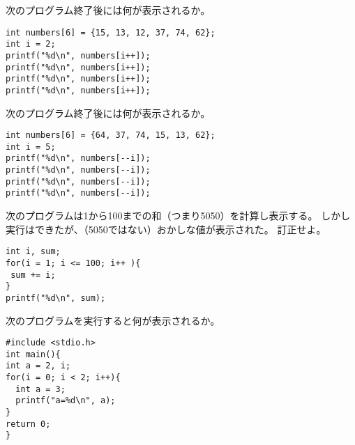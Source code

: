 \documentclass[12pt,a4j]{jarticle}
\newcounter{toi}
\def\toi{%
\bigskip\bigskip\noindent
\addtocounter{toi}{1}
\shadowbox{\bfseries\large 問\thetoi}
\nopagebreak[4]\bigskip\nopagebreak[4]
}
\begin{document}




\toi


次のプログラム終了後には何が表示されるか。
\begin{verbatim}
int numbers[6] = {15, 13, 12, 37, 74, 62};
int i = 2;
printf("%d\n", numbers[i++]);
printf("%d\n", numbers[i++]);
printf("%d\n", numbers[i++]);
printf("%d\n", numbers[i++]);
\end{verbatim}




\toi


次のプログラム終了後には何が表示されるか。
\begin{verbatim}
int numbers[6] = {64, 37, 74, 15, 13, 62};
int i = 5;
printf("%d\n", numbers[--i]);
printf("%d\n", numbers[--i]);
printf("%d\n", numbers[--i]);
printf("%d\n", numbers[--i]);
\end{verbatim}




\toi




次のプログラムは1から100までの和（つまり5050）を計算し表示する。
しかし実行はできたが、（5050ではない）おかしな値が表示された。
訂正せよ。
\begin{verbatim}
int i, sum;
for(i = 1; i <= 100; i++ ){
 sum += i;
}
printf("%d\n", sum);
\end{verbatim}





\toi



次のプログラムを実行すると何が表示されるか。
\begin{verbatim}
#include <stdio.h>
int main(){
int a = 2, i;
for(i = 0; i < 2; i++){
  int a = 3;
  printf("a=%d\n", a);
}
return 0;
}
\end{verbatim}

\end{document}

